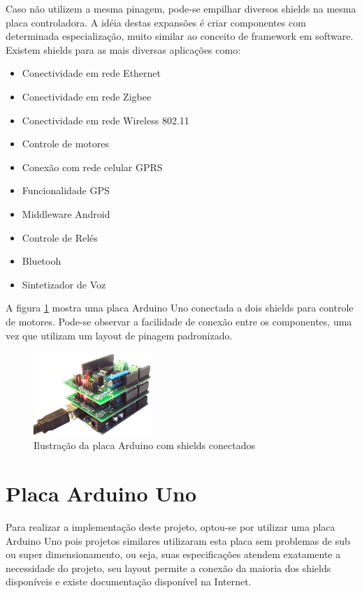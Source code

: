 Caso não utilizem a mesma pinagem, pode-se empilhar diversos shields na mesma placa controladora. A idéia destas expansões é criar componentes com determinada especialização, muito similar ao conceito de framework em software. Existem shields para as mais diversas aplicações como:

\begin{itemize}
	\item Conectividade em rede Ethernet
	\item Conectividade em rede Zigbee
	\item Conectividade em rede Wireless 802.11
	\item Controle de motores
	\item Conexão com rede celular GPRS
	\item Funcionalidade GPS
	\item Middleware Android
	\item Controle de Relés
	\item Bluetooh
	\item Sintetizador de Voz
\end{itemize}

A figura \ref{fig:arduinoshields} mostra uma placa Arduino Uno conectada a dois shields para controle de motores. Pode-se observar a facilidade de conexão entre os componentes, uma vez que utilizam um layout de pinagem padronizado.

\begin{figure}[h!]
			\centering
			\includegraphics[width=0.4\textwidth]{figures/arduino_with_shield.jpg}
			\caption{Ilustra\c{c}\~{a}o da placa Arduino com shields conectados}
			\label{fig:arduinoshields}
\end{figure}

\newpage
\section {Placa Arduino Uno}

Para realizar a implementação deste projeto, optou-se por utilizar uma placa Arduino Uno pois projetos similares utilizaram esta placa sem problemas de sub ou super dimensionamento, ou seja, suas especificações atendem exatamente a necessidade do projeto, seu layout permite a conexão da maioria dos shields disponíveis e existe documentação disponível na Internet.

